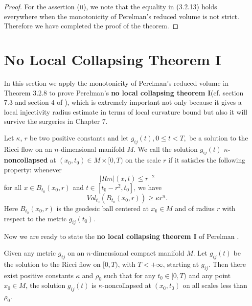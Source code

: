 \begin{proof}
For the assertion (ii), we note that the equality in (3.2.13)
holds everywhere when the monotonicity of  Perelman's reduced
volume is not strict. Therefore we have completed the proof of the
theorem.
\end{proof}


\section{No Local Collapsing Theorem I}

In this section we apply the monotonicity of Perelman's reduced
volume in Theorem 3.2.8 to prove Perelman's  {\bf no local
collapsing theorem I}(cf.
section 7.3 and section 4 of \cite{P1}), which is extremely
important not only because it gives a local injectivity radius
estimate in terms of local curvature bound but also it will
survive the surgeries in Chapter 7.


\begin{definition}
  \label{def:cz-kappa-noncollapsing-at-a-scale}
Let $\kappa$, $r$ be two positive constants and let $g_{ij}(t), 0
\leq t <T,$ be a solution to the Ricci flow on an $n$-dimensional
manifold $M$. We call the solution $g_{ij}(t)$
\textbf{$\kappa$-noncollapsed} at $(x_0,t_0)\in M \times [0,T)$ on
the scale $r$  if it satisfies the
following property: whenever
$$
|Rm|(x,t)\leq r^{-2}
$$
for all $x \in B_{t_0}(x_0,r)$ and $t \in [t_0-r^2,t_0]$, we have
$$Vol_{t_0}(B_{t_0}(x_0,r)) \geq \kappa r^n.$$ Here $B_{t_0}(x_0,r)$ is
the geodesic ball centered at $x_0\in M $ and of radius $r$ with
respect to the metric $g_{ij}(t_0)$.
\end{definition}

Now we are ready to state the {\bf no local collapsing theorem
I} of Perelman \cite{P1}.

\begin{theorem}
  \label{thm:cz-no-local-collapsing-on-a-finite-time-interval}
Given any metric $g_{ij}$ on an $n$-dimensional compact manifold
$M$. Let $g_{ij}(t)$ be the solution to the Ricci flow on $[0,T)$,
with $T<+\infty$, starting at $g_{ij}$. Then there exist positive
constants $\kappa$ and $\rho_0$ such that for any $t_0\in[0,T)$
and any point $x_0\in M$, the solution $g_{ij}(t)$ is
$\kappa$-noncollapsed at $(x_0,t_0)$ on all scales less than
$\rho_0$.
\end{theorem}

